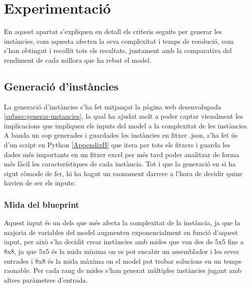 


\chapter{Experimentació} %

\label{Experimentació} %
En aquest apartat s'expliquen en detall els criteris seguits per generar les instàncies, com aquesta afecten la seva complexitat i temps de resolució, com s'han obtingut i recollit tots els resultats, juntament amb la comparativa del rendiment de cada millora que ha rebut el model.

\section{Generació d'instàncies}
La generació d'instàncies s'ha fet mitjançat la pàgina web desenvolupada \ref{subsec:generar-instancies}, la qual ha ajudat molt a poder captar visualment les implicacions que impliquen els inputs del model a la complexitat de les instàncies.\\
A banda un cop generades i guardades les instàncies en fitxer .json, s'ha fet ús d'un script en Python \ref{AppendixB} que itera per tots els fitxers i guarda les dades més importants en un fitxer excel per més tard poder analitzar de forma més fàcil les característiques de cada instància.
Tot i que la generació en si ha sigut còmode de fer, hi ha hagut un raonament darrere a l'hora de decidir quins havien de ser els inputs:

\subsection{Mida del blueprint}
Aquest input és un dels que més afecta la complexitat de la instància, ja que la majoria de variables del model augmenten exponencialment en funció d'aquest input, per això s'ha decidit crear instàncies amb mides que van des de 5x5 fins a 8x8, ja que 5x5 és la mida mínima on es pot encabir un assemblador i les seves entrades i 8x8 és la mida màxima on el model pot trobar solucions en un temps raonable. Per cada rang de mides s'han generat múltiples instàncies jugant amb altres paràmetres d'entrada.

